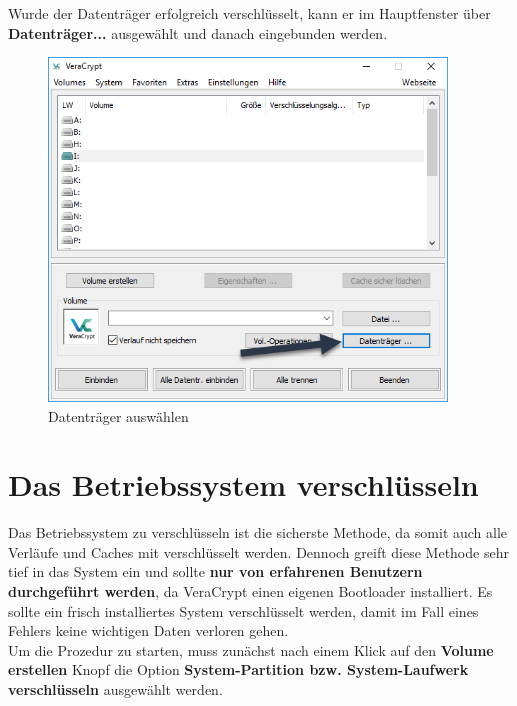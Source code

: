 \documentclass[12pt,a4paper]{scrreprt}
\begin{document}
\noindent Wurde der Datenträger erfolgreich verschlüsselt, kann er im Hauptfenster über \textbf{Datenträger...} ausgewählt und danach eingebunden werden.

\begin{figure}[h]
\begin{center}
\includegraphics[width=300pt]{media/selectdevice2.png}
\caption{Datenträger auswählen}
\label{selectdevice2}
\end{center}
\end{figure}

\section{Das Betriebssystem verschlüsseln}
Das Betriebssystem zu verschlüsseln ist die sicherste Methode, da somit auch alle Verläufe und Caches mit verschlüsselt werden. Dennoch greift diese Methode sehr tief in das System ein und sollte \textbf{nur von erfahrenen Benutzern durchgeführt werden}, da VeraCrypt einen eigenen Bootloader installiert. Es sollte ein frisch installiertes System verschlüsselt werden, damit im Fall eines Fehlers keine wichtigen Daten verloren gehen.\\

\noindent Um die Prozedur zu starten, muss zunächst nach einem Klick auf den \textbf{Volume erstellen} Knopf die Option \textbf{System-Partition bzw. System-Laufwerk verschlüsseln} ausgewählt werden.
\end{document}
